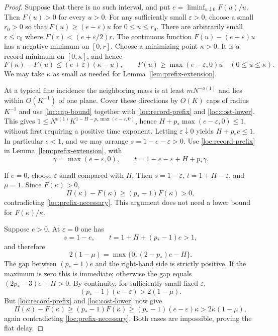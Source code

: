 \begin{proof}
Suppose that there is no such interval, and put
$e=\liminf_{u\downarrow0}F(u)/u$.  Then $F(u)>0$ for every $u>0$.
For any sufficiently small $\varepsilon>0$, choose a small $r_0>0$
so that $F(u)\geq(e-\varepsilon)u$ for $0\leq u\leq r_0$.
There are arbitrarily small $r\leq r_0$ where
$F(r)<(e+\varepsilon/2)r$.  The continuous function
$F(u)-(e+\varepsilon)u$ has a negative minimum on $[0,r]$.
Choose a minimizing point $\kappa>0$.  It is a record minimum
on $[0,\kappa]$, and hence
\begin{equation}
 F(\kappa)-F(u)\leq(e+\varepsilon)(\kappa-u),\qquad
 F(u)\geq\max(e-\varepsilon,0)u
 \quad(0\leq u\leq\kappa).
 \label{loc:record-prefix}
\end{equation}
We may take $\kappa$ as small as needed for
Lemma~\ref{lem:prefix-extension}.

At a typical fine incidence the neighboring mass is at least
$mN^{-o(1)}$ and lies within $O(K^{-1})$ of one plane.  Cover these
directions by $O(K)$ caps of radius $K^{-1}$ and use
\eqref{loc:cap-bound} together with \eqref{loc:record-prefix} and
\eqref{loc:cost-lower}.  This gives
$1\leq N^{o(1)}K^{1-H-p_*\max(e-\varepsilon,0)}$, hence
$H+p_*\max(e-\varepsilon,0)\leq1$, without first requiring a
positive time exponent.  Letting
$\varepsilon\downarrow0$ yields $H+p_*e\leq1$.
In particular $e<1$, and we may arrange
$s=1-e-\varepsilon>0$.  Use
\eqref{loc:record-prefix} in Lemma~\ref{lem:prefix-extension}, with
\[
 \gamma=\max(e-\varepsilon,0),\qquad
 t=1-e-\varepsilon+H+p_*\gamma.
\]

If $e=0$, choose $\varepsilon$ small compared with $H$.  Then
$s=1-\varepsilon$, $t=1+H-\varepsilon$, and
$\mu=1$.  Since $F(\kappa)>0$,
\[
 \Pi(\kappa)-F(\kappa)
       \geq(p_*-1)F(\kappa)>0,
\]
contradicting \eqref{loc:prefix-necessary}.  This argument does not
need a lower bound for $F(\kappa)/\kappa$.

Suppose $e>0$.  At $\varepsilon=0$ one has
\[
 s=1-e,\qquad t=1+H+(p_*-1)e>1,
\]
and therefore
\[
 2(1-\mu)=\max\{0,(2-p_*)e-H\}.
\]
The gap between $(p_*-1)e$ and the right-hand side is strictly
positive.  If the maximum is zero this is immediate; otherwise
the gap equals $(2p_*-3)e+H>0$.  By continuity, for sufficiently
small fixed $\varepsilon$,
\[
 (p_*-1)(e-\varepsilon)>2(1-\mu).
\]
But \eqref{loc:record-prefix} and
\eqref{loc:cost-lower} now give
\[
 \Pi(\kappa)-F(\kappa)
 \geq(p_*-1)F(\kappa)
 \geq(p_*-1)(e-\varepsilon)\kappa
 >2\kappa(1-\mu),
\]
again contradicting \eqref{loc:prefix-necessary}.  Both cases are
impossible, proving the flat delay.
\end{proof}

